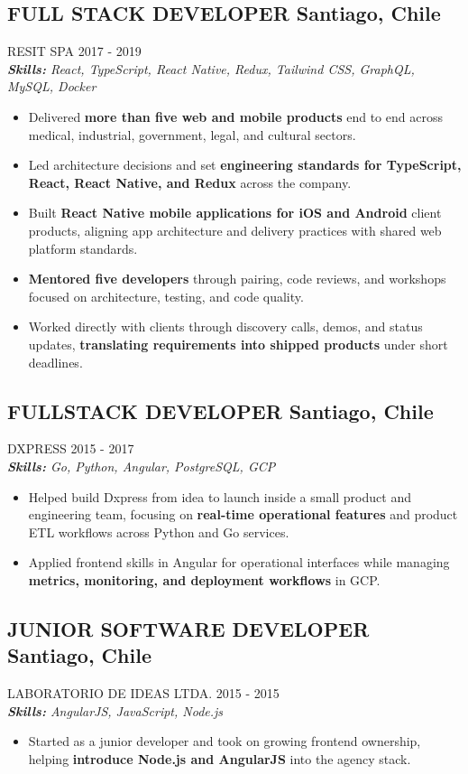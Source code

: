 \documentclass{article}
\newcommand{\WorkExperience}[2]{
   \subsection*{#1}
   \vspace{-1em}
   \uppercase{#2}
}
\newcommand{\Skills}[1]{
   \textit{\textbf{Skills:} #1}
}
\begin{document}
\WorkExperience{FULL STACK DEVELOPER \hfill Santiago, Chile}{Resit SPA \hfill 2017 {-} 2019} \\
\Skills{React, TypeScript, React Native, Redux, Tailwind CSS, GraphQL, MySQL, Docker}
\begin{itemize}
	\item Delivered \textbf{more than five web and mobile products} end to end across medical, industrial, government, legal, and cultural sectors.
	\item Led architecture decisions and set \textbf{engineering standards for TypeScript, React, React Native, and Redux} across the company.
	\item Built \textbf{React Native mobile applications for iOS and Android} client products, aligning app architecture and delivery practices with shared web platform standards.
	\item \textbf{Mentored five developers} through pairing, code reviews, and workshops focused on architecture, testing, and code quality.
	\item Worked directly with clients through discovery calls, demos, and status updates, \textbf{translating requirements into shipped products} under short deadlines.
\end{itemize}

\WorkExperience{FULLSTACK DEVELOPER \hfill Santiago, Chile}{Dxpress \hfill 2015 {-} 2017} \\
\Skills{Go, Python, Angular, PostgreSQL, GCP}
\begin{itemize}
	\item Helped build Dxpress from idea to launch inside a small product and engineering team, focusing on \textbf{real-time operational features} and product ETL workflows across Python and Go services.
	\item Applied frontend skills in Angular for operational interfaces while managing \textbf{metrics, monitoring, and deployment workflows} in GCP.
\end{itemize}

\WorkExperience{JUNIOR SOFTWARE DEVELOPER \hfill Santiago, Chile}{Laboratorio de Ideas Ltda. \hfill 2015 {-} 2015} \\
\Skills{AngularJS, JavaScript, Node.js}
\begin{itemize}
	\item Started as a junior developer and took on growing frontend ownership, helping \textbf{introduce Node.js and AngularJS} into the agency stack.
\end{itemize}
\end{document}
